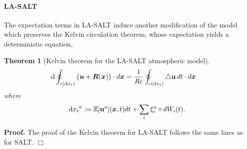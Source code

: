 \documentclass[11pt, oneside]{article}   	%
\numberwithin{equation}{section}
\theoremstyle{plain}
\newtheorem{theorem}{Theorem}[section]
\theoremstyle{definition}
\theoremstyle{remark}
\newcommand{\<}{\langle}
\renewcommand{\>}{\rangle}
\def\U{{\bf u}}
\def\rmd{{\mathrm{d}}}
\newcommand{\bs}[1]{\boldsymbol{#1}}
\begin{document}
\paragraph{LA-SALT}
The expectation terms in LA-SALT induce another modification of the model which preserves the Kelvin circulation theorem, whose expectation yields a deterministic equation,
\begin{theorem}[Kelvin theorem for the LA-SALT atmospheric model]
\begin{align}
{\rmd}\oint_{c({\rmd x_t})} \big(\bs{u}+ \bs{R}(\bs{x})\big)\cdot d\bs{x}
&=
\frac{1}{Re}\oint_{c({\rmd x_t})} \triangle\U \,dt\cdot d\bs{x}
\label{KelThm-LASALT}
\end{align}
where 
\[{\rmd x_t}^a := \mathbb{E}[\U^a](\bs{x},t)dt+\sum_i\xi_i^a\circ dW_i(t).\]
\end{theorem}
\noindent 
{\bf Proof.} The proof of the Kelvin theorem for LA-SALT follows the same lines as for SALT. $\Box$

\end{document}
